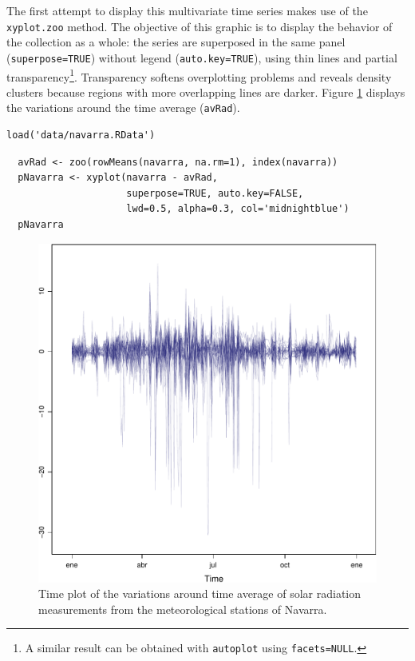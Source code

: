 \documentclass[smallroyalvopaper]{memoir}
\begin{document}
The first attempt to display this multivariate time series makes use
of the \texttt{xyplot.zoo} method. The objective of this graphic is to
display the behavior of the collection as a whole: the series are
superposed in the same panel (\texttt{superpose=TRUE}) without legend
(\texttt{auto.key=TRUE}), using thin lines and partial
transparency\footnote{A similar result can be obtained with \texttt{autoplot} using \texttt{facets=NULL}.}. Transparency softens overplotting problems and reveals
density clusters because regions with more overlapping lines are
darker. Figure \ref{fig:navarraNaive} displays the variations
around the time average (\texttt{avRad}).

\lstset{language=r,label= ,caption= ,captionpos=b,numbers=none}
\begin{lstlisting}
load('data/navarra.RData')
\end{lstlisting}



\lstset{language=r,label= ,caption= ,captionpos=b,numbers=none}
\begin{lstlisting}
  avRad <- zoo(rowMeans(navarra, na.rm=1), index(navarra))
  pNavarra <- xyplot(navarra - avRad,
                     superpose=TRUE, auto.key=FALSE,
                     lwd=0.5, alpha=0.3, col='midnightblue') 
  pNavarra
\end{lstlisting}

\begin{figure}[htbp]
\centering
\includegraphics[width=.9\linewidth]{figs/navarra.pdf}
\caption{Time plot of the variations around time average of solar radiation measurements from the meteorological stations of Navarra. \label{fig:navarraNaive}}
\end{figure}
\end{document}
